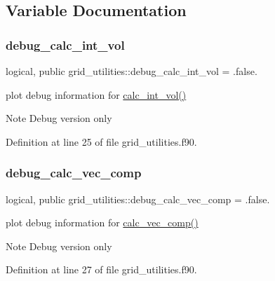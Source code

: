 \subsection{Variable Documentation}
\mbox{\label{namespacegrid__utilities_a0743c0341d508034b14aee614fa4f8a9}} 
\subsubsection{\texorpdfstring{debug\+\_\+calc\+\_\+int\+\_\+vol}{debug\_calc\_int\_vol}}
{\footnotesize\ttfamily logical, public grid\+\_\+utilities\+::debug\+\_\+calc\+\_\+int\+\_\+vol = .false.}



plot debug information for \hyperlink{namespacegrid__utilities_a97e3106dbdc10b726af74afa113ba533}{calc\+\_\+int\+\_\+vol()} 

\begin{DoxyNote}{Note}
Debug version only 
\end{DoxyNote}


Definition at line 25 of file grid\+\_\+utilities.\+f90.

\mbox{\label{namespacegrid__utilities_ab420036236dc8a9a69e180550499d95b}} 
\subsubsection{\texorpdfstring{debug\+\_\+calc\+\_\+vec\+\_\+comp}{debug\_calc\_vec\_comp}}
{\footnotesize\ttfamily logical, public grid\+\_\+utilities\+::debug\+\_\+calc\+\_\+vec\+\_\+comp = .false.}



plot debug information for \hyperlink{namespacegrid__utilities_ad3d9386b9abcb1a7e17369a1b3a3750d}{calc\+\_\+vec\+\_\+comp()} 

\begin{DoxyNote}{Note}
Debug version only 
\end{DoxyNote}


Definition at line 27 of file grid\+\_\+utilities.\+f90.

